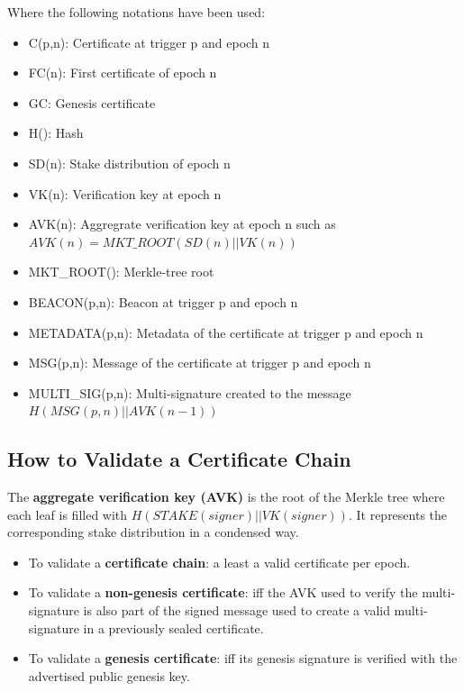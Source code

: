 \documentclass{article}
\begin{document}
Where the following notations have been used:

\begin{itemize}
    \item C(p,n): Certificate at trigger p and epoch n
\item FC(n): First certificate of epoch n
\item GC: Genesis certificate
\item H(): Hash
\item SD(n): Stake distribution of epoch n
\item VK(n): Verification key at epoch n
\item AVK(n): Aggregrate verification key at epoch n such as $AVK(n) = MKT\_ROOT(SD(n)\vert\vert VK(n))$
\item MKT\_ROOT(): Merkle-tree root
\item BEACON(p,n): Beacon at trigger p and epoch n
\item METADATA(p,n): Metadata of the certificate at trigger p and epoch n
\item MSG(p,n): Message of the certificate at trigger p and epoch n
\item MULTI\_SIG(p,n): Multi-signature created to the message $H(MSG(p,n) \vert \vert AVK(n-1))$
\end{itemize}

\subsection{How to Validate a Certificate Chain}

The \textbf{aggregate verification key (AVK)} is the root of the Merkle tree where each leaf is filled with $H(STAKE(signer) \vert \vert VK(signer))$. It represents the corresponding stake distribution in a condensed way.

\begin{itemize}
    \item To validate a \textbf{certificate chain}: a least a valid certificate per epoch.
    \item To validate a \textbf{non-genesis certificate}: iff the AVK used to verify the multi-signature is also part of the signed message used to create a valid multi-signature in a previously sealed certificate. 
    \item To validate a \textbf{genesis certificate}: iff its genesis signature is verified with the advertised public genesis key.
\end{itemize}
\end{document}
